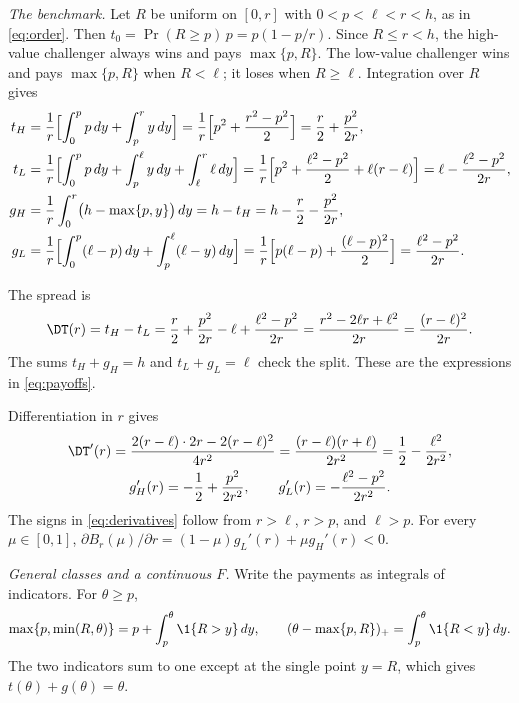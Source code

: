 \emph{The benchmark.} Let \(R\) be uniform on \([0,r]\) with \(0<p<\ell<r<h\), as in \eqref{eq:order}. Then
\(t_0=\Pr(R\ge p)\,p=p(1-p/r)\). Since \(R\le r<h\), the high-value challenger always wins and pays
\(\max\{p,R\}\). The low-value challenger wins and pays \(\max\{p,R\}\) when \(R<\ell\); it loses when
\(R\ge\ell\). Integration over \(R\) gives
\begin{equation}\label{eq:a-payoffs}
\begin{aligned}
t_H&=\frac1r\Bigl[\int_0^p p\,dy+\int_p^r y\,dy\Bigr]
=\frac1r\Bigl[p^2+\frac{r^2-p^2}2\Bigr]=\frac r2+\frac{p^2}{2r},\\
t_L&=\frac1r\Bigl[\int_0^p p\,dy+\int_p^\ell y\,dy+\int_\ell^r\ell\,dy\Bigr]
=\frac1r\Bigl[p^2+\frac{\ell^2-p^2}2+\ell(r-\ell)\Bigr]=\ell-\frac{\ell^2-p^2}{2r},\\
g_H&=\frac1r\int_0^r\bigl(h-\max\{p,y\}\bigr)\,dy=h-t_H=h-\frac r2-\frac{p^2}{2r},\\
g_L&=\frac1r\Bigl[\int_0^p(\ell-p)\,dy+\int_p^\ell(\ell-y)\,dy\Bigr]
=\frac1r\Bigl[p(\ell-p)+\frac{(\ell-p)^2}2\Bigr]=\frac{\ell^2-p^2}{2r}.
\end{aligned}
\end{equation}

The spread is
\[
\DT(r)=t_H-t_L=\frac r2+\frac{p^2}{2r}-\ell+\frac{\ell^2-p^2}{2r}=\frac{r^2-2\ell r+\ell^2}{2r}
=\frac{(r-\ell)^2}{2r}.
\]
The sums \(t_H+g_H=h\) and \(t_L+g_L=\ell\) check the split. These are the expressions in \eqref{eq:payoffs}.

Differentiation in \(r\) gives
\[
\begin{gathered}
\DT'(r)=\frac{2(r-\ell)\cdot2r-2(r-\ell)^2}{4r^2}=\frac{(r-\ell)(r+\ell)}{2r^2}=\frac12-\frac{\ell^2}{2r^2},\\
g_H'(r)=-\frac12+\frac{p^2}{2r^2},\qquad g_L'(r)=-\frac{\ell^2-p^2}{2r^2}.
\end{gathered}
\]
The signs in \eqref{eq:derivatives} follow from \(r>\ell\), \(r>p\), and \(\ell>p\). For every
\(\mu\in[0,1]\), \(\partial B_r(\mu)/\partial r=(1-\mu)g_L'(r)+\mu g_H'(r)<0\).

\emph{General classes and a continuous \(F\).} Write the payments as integrals of indicators. For
\(\theta\ge p\),
\begin{equation}\label{eq:a-indicators}
\max\{p,\min(R,\theta)\}=p+\int_p^\theta\1\{R>y\}\,dy,
\qquad
(\theta-\max\{p,R\})_+=\int_p^\theta\1\{R<y\}\,dy.
\end{equation}
The two indicators sum to one except at the single point \(y=R\), which gives \(t(\theta)+g(\theta)=\theta\).

